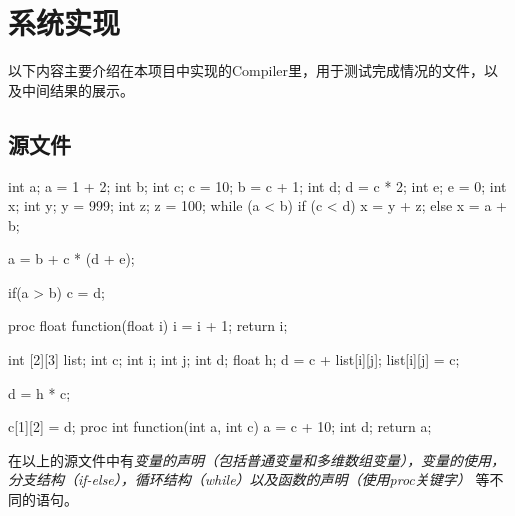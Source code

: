 \documentclass{ML}
\begin{document}
\section{系统实现}
    以下内容主要介绍在本项目中实现的Compiler里，用于测试完成情况的文件，以及中间结果的展示。
\subsection{源文件}\label{sec:source}
\begin{ccode}
    int a;
    a = 1 + 2;
    int b;
    int c;
    c = 10;
    b = c + 1;
    int d;
    d = c * 2;
    int e;
    e = 0;
    int x;
    int y;
    y = 999;
    int z;
    z = 100;
    while (a < b)
        if (c < d) x = y + z; else x = a + b;
    
    a = b + c * (d + e);
    
    if(a > b)
        c = d;
    
    proc float function(float i){
        i = i + 1;
        return i;
    }
        
        int [2][3] list;
        int c;
        int i;
        int j;
        int d;
        float h;
        d = c + list[i][j];
        list[i][j] = c;
        
        d = h * c;
        
        c[1][2] = d;
        proc int function(int a, int c){
            a = c + 10;
            int d;
            return a;
    }        
\end{ccode}

在以上的源文件中有\textit{变量的声明（包括普通变量和多维数组变量），变量的使用，分支结构（if-else），循环结构（while）以及函数的声明（使用proc关键字）}
等不同的语句。
\end{document}
